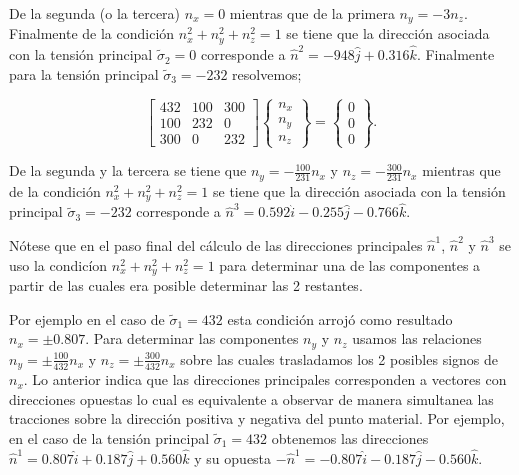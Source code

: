 \documentclass[../notas medios.tex]{subfiles}
\begin{document}
De la segunda (o la tercera) ${n_x} = 0$ mientras que de la primera ${n_y} =  - 3{n_z}$. Finalmente de la condición $n_x^2 + n_y^2 + n_z^2 = 1$ se tiene que la dirección asociada con la tensión principal ${{\tilde \sigma }_2} = 0$ corresponde a ${{\hat n}^2} =-948\hat j + 0.316\hat k$.
%
Finalmente para la tensión principal ${{\tilde \sigma }_3} =  - 232$ resolvemos;

\[\left[ {\begin{array}{*{20}{c}}
{ 432}&{100}&{300}\\
{100}&{ 232}&0\\
{300}&0&{232}
\end{array}} \right]\left\{ {\begin{array}{*{20}{c}}
{{n_x}}\\
{{n_y}}\\
{{n_z}}
\end{array}} \right\} = \left\{ {\begin{array}{*{20}{c}}
0\\
0\\
0
\end{array}} \right\}.\]

De la segunda y la tercera se tiene que ${n_y} =  - \frac{{100}}{{231}}{n_x}$ y ${n_z} =  - \frac{{300}}{{231}}{n_x}$  mientras que de la condición $n_x^2 + n_y^2 + n_z^2 = 1$ se tiene que la dirección asociada con la tensión principal ${{\tilde \sigma }_3} = -232$ corresponde a ${{\hat n}^3} = 0.592\hat i - 0.255\hat j - 0.766\hat k$.

Nótese que en el paso final del cálculo de las direcciones principales ${{\hat n}^1}$, ${{\hat n}^2}$ y ${{\hat n}^3}$ se uso la condicíon $n_x^2 + n_y^2 + n_z^2 = 1$ para determinar una de las componentes a partir de las cuales era posible determinar las 2 restantes.

Por ejemplo en el caso de ${{\tilde \sigma }_1} = 432$ esta condición arrojó como resultado ${n_x} =  \pm 0.807$. Para determinar las componentes ${n_y}$ y ${n_z}$ usamos las relaciones ${n_y} = \pm \frac{{100}}{{432}}{n_x}$ y ${n_z} = \pm \frac{{300}}{{432}}{n_x}$ sobre las cuales trasladamos los 2 posibles signos de ${n_x}$. Lo anterior indica que las direcciones principales corresponden a vectores con direcciones opuestas lo cual es equivalente a observar de manera simultanea las tracciones sobre la dirección positiva y negativa del punto material. Por ejemplo, en el caso de la tensión principal ${{\tilde \sigma }_1} = 432$ obtenemos las direcciones ${{\hat n}^1} = 0.807\hat i + 0.187\hat j + 0.560\hat k$ y su opuesta ${{-\hat n}^1} = -0.807\hat i - 0.187\hat j - 0.560\hat k$.
%
\end{document}

